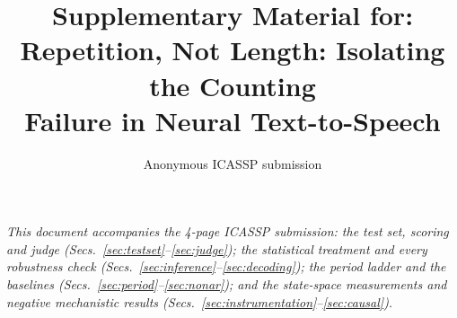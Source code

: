 \documentclass[11pt]{article}
\title{Supplementary Material for:\\[2pt]
\large Repetition, Not Length: Isolating the Counting\\
Failure in Neural Text-to-Speech}
\author{Anonymous ICASSP submission}
\date{}
\begin{document}
\maketitle

\vspace{-2.5em}
\begin{center}
\emph{This document accompanies the 4-page ICASSP submission: the test
set, scoring and judge (Secs.~\ref{sec:testset}--\ref{sec:judge});
the statistical treatment and every robustness check
(Secs.~\ref{sec:inference}--\ref{sec:decoding}); the period ladder and the
baselines (Secs.~\ref{sec:period}--\ref{sec:nonar}); and the state-space
measurements and negative mechanistic results
(Secs.~\ref{sec:instrumentation}--\ref{sec:causal}).}
\end{center}














\end{document}
